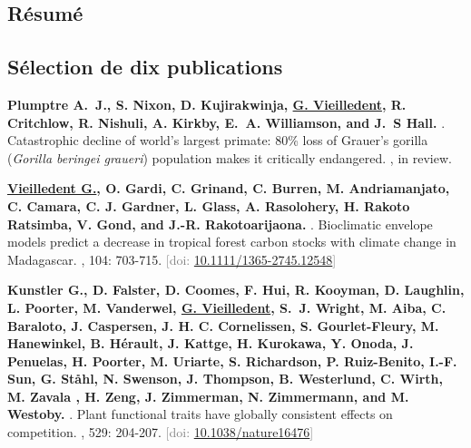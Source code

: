 \documentclass[10pt,a4paper,sans]{moderncv}
\newcounter{enumiv_gv}
\begin{document}
\vspace{0.3cm}
\subsection{Résumé}


\vspace{0.3cm}
\subsection{Sélection de dix publications}

\begin{thebibliography}{10}

\setcounter{enumiv}{9}
\textbf{Plumptre A.~J., S. Nixon, D. Kujirakwinja, \underline{G. Vieilledent}, R. Critchlow, R. Nishuli, A. Kirkby, E.~A. Williamson, and J.~S Hall.} 
.
\newblock Catastrophic decline of world’s largest primate: 80\% loss of Grauer’s gorilla (\emph{Gorilla beringei graueri}) population makes it critically endangered.
, in review.

\setcounter{enumiv}{8}
\textbf{\underline{Vieilledent G.}, O. Gardi, C. Grinand, C. Burren, M. Andriamanjato, C. Camara, C. J. Gardner, L. Glass, A. Rasolohery, H. Rakoto Ratsimba, V. Gond, and J.-R. Rakotoarijaona.} 
.
\newblock Bioclimatic envelope models predict a decrease in tropical forest carbon stocks with climate change in Madagascar.
, 104: 703-715.
\newblock \textcolor{gray}{[doi: \href{http://dx.doi.org/10.1111/1365-2745.12548}{10.1111/1365-2745.12548}]}

\setcounter{enumiv}{7}
\textbf{Kunstler G., D. Falster, D. Coomes, F. Hui, R. Kooyman, D. Laughlin, L. Poorter, M. Vanderwel, \underline{G. Vieilledent}, S.~J. Wright, M. Aiba, C. Baraloto, J. Caspersen, J. H. C. Cornelissen, S. Gourlet-Fleury, M. Hanewinkel, B. Hérault, J. Kattge, H. Kurokawa, Y. Onoda, J. Penuelas, H. Poorter, M. Uriarte, S. Richardson, P. Ruiz-Benito, I.-F. Sun, G. Ståhl, N. Swenson, J. Thompson, B. Westerlund, C. Wirth, M. Zavala , H. Zeng, J. Zimmerman, N. Zimmermann, and M. Westoby.} 
.
\newblock Plant functional traits have globally consistent effects on competition.
, 529: 204-207.
\newblock \textcolor{gray}{[doi: \href{http://dx.doi.org/10.1038/nature16476}{10.1038/nature16476}]}


\end{thebibliography}
\end{document}
